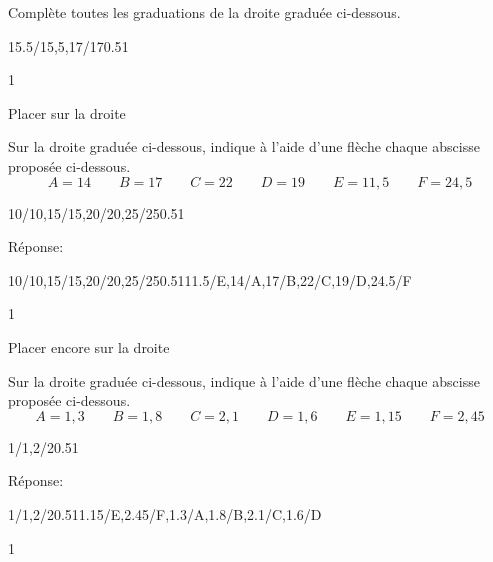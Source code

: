 \documentclass[a4paper,11pt]{report}
\begin{document}
\begin{exop}{
Complète toutes les graduations de la droite graduée ci-dessous.
\begin{center}
	\begin{numberlined}{15.5}{17.75}{1.5}{0.15}{15.5/{15,5},17/17}{0.5}{1}{}
	\end{numberlined}
\end{center}
}{1}\end{exop}

\begin{resolu}{Placer sur la droite}
{Sur la droite graduée ci-dessous, indique à l'aide d'une flèche chaque abscisse proposée ci-dessous.
$$A=14\qquad B=17\qquad C=22\qquad D=19 \qquad E= 11,5 \qquad F=24,5$$	
\begin{center}
\begin{numberlined}{10}{25}{5}{1}{10/10,15/15,20/20,25/25}{0.5}{1}{}
	\end{numberlined}
\end{center}
	Réponse:
	\begin{center}
\begin{numberlined}{10}{25}{5}{1}{10/10,15/15,20/20,25/25}{0.5}{1}{11.5/E,14/A,17/B,22/C,19/D,24.5/F}
	\end{numberlined}
\end{center}
}{1}
\end{resolu}

\begin{resolu}{Placer encore sur la droite}
{Sur la droite graduée ci-dessous, indique à l'aide d'une flèche chaque abscisse proposée ci-dessous.
$$A=1,3\qquad B=1,8\qquad C=2,1\qquad D=1,6 \qquad E= 1,15 \qquad F=2,45$$
\begin{center}
	\begin{numberlined}{1}{2.6}{1}{0.1}{1/1,2/2}{0.5}{1}{}
	\end{numberlined}
\end{center}
	Réponse:
	\begin{center}
		\begin{numberlined}{1}{2.6}{1}{0.1}{1/1,2/2}{0.5}{1}{1.15/E,2.45/F,1.3/A,1.8/B,2.1/C,1.6/D}
	\end{numberlined}
\end{center}
}{1}
\end{resolu}
\end{document}
